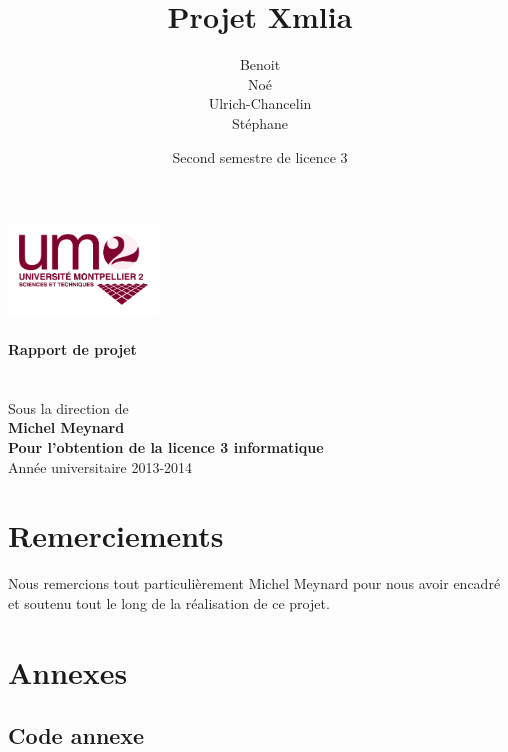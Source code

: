 \documentclass [a4 paper,11pt]{report}
\title {Projet Xmlia}
\author {
\bsc{BOIVIN} Benoit\\
\bsc{LE PHILIPPE} Noé\\
\bsc{KEGBA-SANGO-SANGO} Ulrich-Chancelin\\
\bsc{WOUTERS} Stéphane
}
\date{Second semestre de licence 3}
\begin{document}
\makeatletter
\begin{titlepage}
  \centering
  \vspace{1cm}
     \includegraphics[width=0.3\textwidth]{images/logo_um2.png}\\
    \vspace{1cm}
      {\large\textbf{	\@date\\
       Rapport de projet}}\\
    \vfill
       {\LARGE \textbf{\@title}} \\
    \vspace{2em}
        {\large \@author} \\
    \vfill
    Sous la direction de\\
    {\textbf{Michel Meynard}} \\
    \vfill
       {\textbf{Pour l'obtention de la licence 3 informatique}} \\
       Année universitaire 2013-2014 \\
\end{titlepage}
\makeatother
\thispagestyle{empty}

              
\chapter*{Remerciements}
Nous remercions tout particulièrement Michel Meynard pour nous avoir encadré et soutenu tout le long de la réalisation de ce projet.

\tableofcontents










\chapter{Annexes}

\section{Code annexe}
\end{document}

